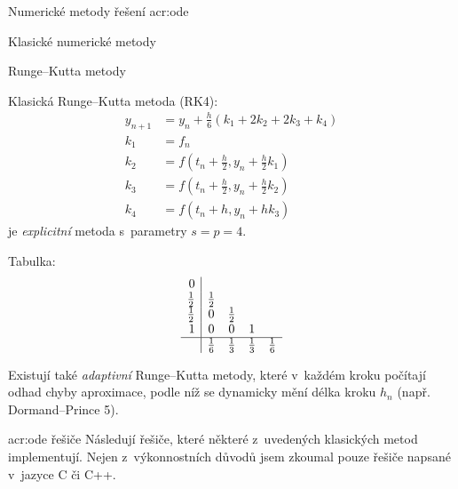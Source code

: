 \documentclass[thesis=M,czech]{FITthesis}[2012/06/26]
\newcommand{\acrlabel}[1]{acr:#1}
\newcommand{\acr}[1]{\acrshort{\acrlabel{#1}}}
\newcommand{\hl}[1]{\textit{#1}}
\begin{document}
\begin{section}{Numerické metody řešení \acr{ode}}
\begin{subsection}{Klasické numerické metody}
\begin{subsubsection}{Runge--Kutta metody}
\begin{paragraph}{Klasická Runge--Kutta metoda (RK4):}
\label{sss:search:ode:classic:rk:rk4}
\begin{equation}\label{eq:ode:rk:rk4}
\begin{split}
   y_{n+1} &= y_{n} + \frac{h}{6} ( k_1 + 2 k_2 + 2 k_3 + k_4 ) \\
   k_1     &= f_n \\
   k_2     &= f \! \left( t_n + \frac{h}{2}, y_n + \frac{h}{2} k_1 \right) \\
   k_3     &= f \! \left( t_n + \frac{h}{2}, y_n + \frac{h}{2} k_2 \right) \\
   k_4     &= f \! \left( t_n + h, y_n + h k_3 \right)
\end{split}
\end{equation}
je \hl{explicitní} metoda s~parametry ${s = p = 4}$.

Tabulka:
\begin{equation*}
\begin{array}{r|cccc}
             0  &             &             &             &             \\
   \frac{1}{2}  & \frac{1}{2} &             &             &             \\
   \frac{1}{2}  &           0 & \frac{1}{2} &             &             \\
             1  &           0 &           0 &           1 &             \\
\hline
                & \frac{1}{6} & \frac{1}{3} & \frac{1}{3} & \frac{1}{6}
\end{array}
\end{equation*}
\end{paragraph} %


\bigskip

Existují také \hl{adaptivní} Runge--Kutta metody,
které v~každém kroku počítají odhad chyby aproximace,
podle níž se dynamicky mění délka kroku $h_n$
(např. Dormand--Prince 5).
\end{subsubsection} %


\begin{subsubsection}{\acr{ode} řešiče}\label{sss:search:ode:classic:solver}
Následují řešiče, které některé z~uvedených klasických metod implementují.
Nejen z~výkonnostních důvodů jsem zkoumal pouze
řešiče napsané v~jazyce C či C++.


\end{subsubsection}
\end{subsection}
\end{section}
\end{document}
